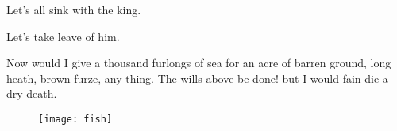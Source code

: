 

\begin{verse_speech}[Antonio] Let's all sink with the king.\end{verse_speech}

\begin{verse_speech}[Sebastian] Let's take leave of him.\end{verse_speech}


\begin{prose_speech}[Gonzalo] Now would I give a thousand furlongs of sea for an acre of barren ground, long heath, brown furze, any  thing. The wills above be done! but I would fain die a dry death.
\end{prose_speech}

\exeunt{}

\begin{figure}[b]
	\centering
	\texttt{[image: fish]}
\end{figure}

